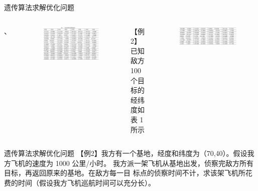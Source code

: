 \documentclass[xcolor=table,dvipsnames,svgnames,aspectratio=169,fontset=ubuntu]{ctexbeamer}
\begin{document}
\begin{frame}{遗传算法求解优化问题}
  \begin{columns}
    、
    \begin{figure}
      \centering
      \includegraphics[width=\textwidth]{例1-1.png}
    \end{figure}
    【例2】
    \vskip 10pt
    已知敌方 100 个目标的经纬度如表 1 所示   
    \begin{figure}
      \centering
      \includegraphics[width=\textwidth]{例1-2.png}
    \end{figure}
  \end{columns}
\end{frame}

\begin{frame}{遗传算法求解优化问题}
  【例2】我方有一个基地，经度和纬度为（70,40）。假设我方飞机的速度为 1000 公里/小时。
  我方派一架飞机从基地出发，侦察完敌方所有目标，再返回原来的基地。在敌方每一目
  标点的侦察时间不计，求该架飞机所花费的时间（假设我方飞机巡航时间可以充分长）。
\end{frame}
\end{document}
